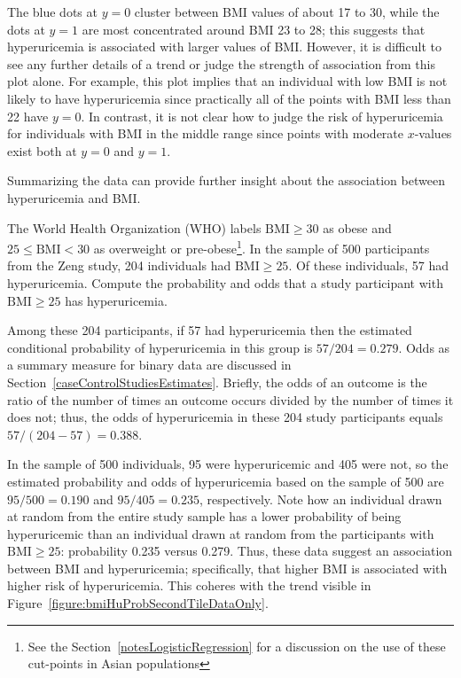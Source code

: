 The blue dots at $y = 0$ cluster between BMI values of about 17 to 30, while the dots at $y = 1$ are most concentrated around BMI 23 to 28; this suggests that hyperuricemia is associated with larger values of BMI. However, it is difficult to see any further details of a trend or judge the strength of association from this plot alone. For example, this plot implies that an individual with low BMI is not likely to have hyperuricemia since practically all of the points with BMI less than 22 have $y = 0$. In contrast, it is not clear how to judge the risk of hyperuricemia for individuals with BMI in the middle range since points with moderate $x$-values exist both at $y = 0$ and $y = 1$.

Summarizing the data can provide further insight about the association between hyperuricemia and BMI.

\begin{examplewrap}
\begin{nexample}{The World Health Organization (WHO) labels $\text{BMI} \ge 30$ as obese and $25 \le \text{BMI} < 30$ as overweight or pre-obese\footnote{See the Section~\ref{notesLogisticRegression} for a discussion on the use of these cut-points in Asian populations}. In the sample of 500 participants from the Zeng study, 204 individuals had $\text{BMI} \geq 25$. Of these individuals, 57 had hyperuricemia. Compute the probability and odds that a study participant with $\text{BMI} \ge 25$ has hyperuricemia.}\label{example:preobeseHyperurcemia}

    Among these 204 participants, if 57 had hyperuricemia then the estimated conditional probability of hyperuricemia in this group is $57/204 = 0.279$. Odds as a summary measure for binary data are discussed in Section~\ref{caseControlStudiesEstimates}. Briefly, the odds of an outcome is the ratio of the number of times an outcome occurs divided by the number of times it does not; thus, the odds of hyperuricemia in these 204 study participants equals $57/(204 - 57) = 0.388$.
\end{nexample}
\end{examplewrap}

In the sample of 500 individuals, 95 were hyperuricemic and 405 were not, so the estimated probability and odds of hyperuricemia based on the sample of 500 are $95/500 = 0.190$ and $95/405 = 0.235$, respectively. Note how an individual drawn at random from the entire study sample has a lower probability of being hyperuricemic than an individual drawn at random from the participants with  $\text{BMI} \geq 25$: probability 0.235 versus 0.279. Thus, these data suggest an association between BMI and hyperuricemia; specifically, that higher BMI is associated with higher risk of hyperuricemia. This coheres with the trend visible in Figure~\ref{figure:bmiHuProbSecondTileDataOnly}.

